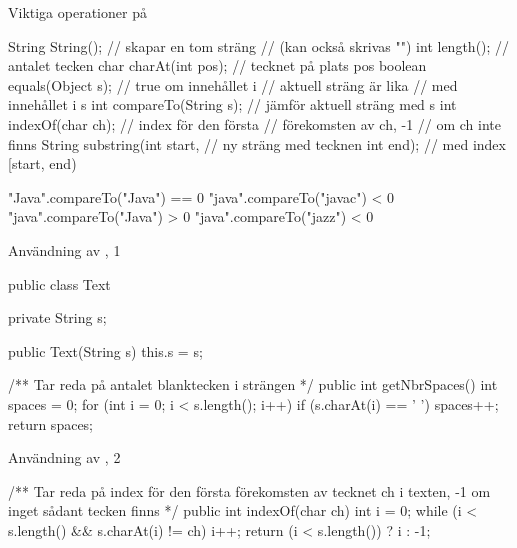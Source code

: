 \documentclass{lecturenotes}
\begin{document}
\begin{Slide}{Viktiga operationer på }

\begin{ClassSpec}{String}
String();                   // skapar en tom sträng
                            // (kan också skrivas "")
int length();               // antalet tecken 
char charAt(int pos);       // tecknet på plats pos
boolean equals(Object s);   // true om innehållet i 
                            // aktuell sträng är lika 
                            // med innehållet i s
int compareTo(String s);    // jämför aktuell sträng med s
int indexOf(char ch);       // index för den första
                            // förekomsten av ch, -1
                            // om ch inte finns
String substring(int start, // ny sträng med tecknen 
                 int end);  // med index [start, end)
\end{ClassSpec}

\begin{Code}
"Java".compareTo("Java") == 0
"java".compareTo("javac") < 0
"java".compareTo("Java") > 0
"java".compareTo("jazz") < 0
\end{Code}

\end{Slide} 

\begin{Slide}{Användning av , 1}
\begin{Code}
public class Text {
    private String s;
    
    public Text(String s) {
        this.s = s;
    }

    /** Tar reda på antalet blanktecken i strängen */
    public int getNbrSpaces() {
        int spaces = 0;
        for (int i = 0; i < s.length(); i++) {
            if (s.charAt(i) == ' ') {
                spaces++;
            }
        }
        return spaces;
    }
}
\end{Code}
\end{Slide} 

\begin{Slide}{Användning av , 2}
\begin{Code}
/** Tar reda på index för den första förekomsten av tecknet
    ch i texten, -1 om inget sådant tecken finns */
public int indexOf(char ch) {
    int i = 0;
    while (i < s.length() && s.charAt(i) != ch) {
        i++;
    }
    return (i < s.length()) ? i : -1;
}
\end{Code}
\end{Slide} 
\end{document}
